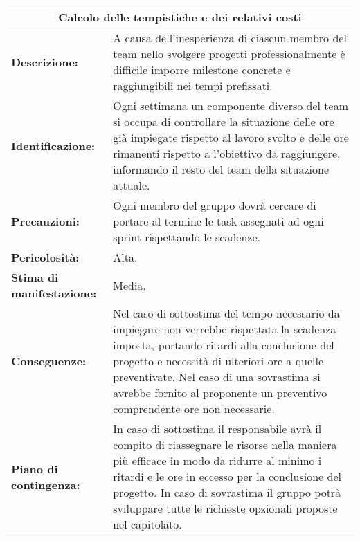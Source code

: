 \begin{tabular}{ |p{4cm}|p{10cm}|}
\hline
\multicolumn{2}{|c|}{\textbf{Calcolo delle tempistiche e dei relativi costi}} \\
\hline
\textbf{Descrizione:}& A causa dell'inesperienza di ciascun membro del team nello svolgere progetti professionalmente è difficile imporre milestone concrete e raggiungibili nei tempi prefissati. \\
\hline
\textbf{Identificazione:}& Ogni settimana un componente diverso del team si occupa di controllare la situazione delle ore già impiegate rispetto al lavoro svolto e delle ore rimanenti rispetto a l'obiettivo da raggiungere, informando il resto del team della situazione attuale.\\
\hline
\textbf{Precauzioni:}& Ogni membro del gruppo dovrà cercare di portare al termine le task assegnati ad ogni sprint rispettando le scadenze.\\
\hline
\textbf{Pericolosità:}& Alta.\\
\hline
\textbf{Stima di manifestazione:}& Media.\\
\hline
\textbf{Conseguenze:}& Nel caso di sottostima del tempo necessario da impiegare non verrebbe rispettata la scadenza imposta, portando ritardi alla conclusione del progetto e necessità di ulteriori ore a quelle preventivate. Nel caso di una sovrastima si avrebbe fornito al proponente un preventivo comprendente ore non necessarie.\\
\hline
\textbf{Piano di contingenza:}& In caso di sottostima il responsabile avrà il compito di riassegnare le risorse nella maniera più efficace in modo da ridurre al minimo i ritardi e le ore in eccesso per la conclusione del progetto. In caso di sovrastima il gruppo potrà sviluppare tutte le richieste opzionali proposte nel capitolato.\\
\hline
\end{tabular}

\vspace{20pt}

